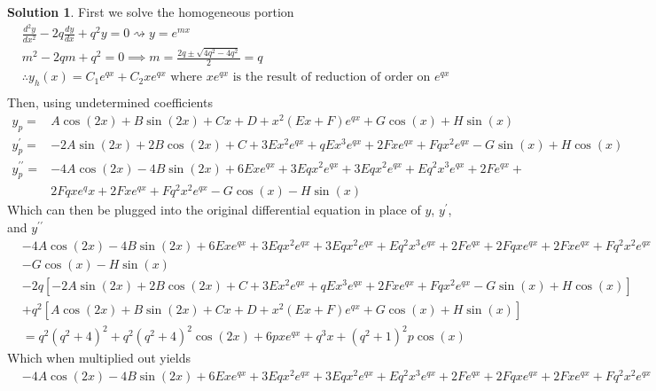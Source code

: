 \documentclass[10pt]{article}
\theoremstyle{definition}
\newtheorem{soln}{Solution}
\begin{document}
\begin{soln} First we solve the homogeneous portion
  \begin{align*}
     & \frac{d^2y}{dx^2}-2q\frac{dy}{dx}+q^2y=0\rightsquigarrow y=e^{mx}                                                    \\
     & m^2-2qm+q^2=0 \implies m = \frac{2q\pm\sqrt{4q^2-4q^2}}{2} = q                                                       \\
     & \therefore y_h(x)=C_1e^{qx}+C_2xe^{qx} \text{ where } xe^{qx} \text{ is the result of reduction of order on } e^{qx} \\
  \end{align*}
  Then, using undetermined coefficients
  \begin{align*}
    y_p=                & A\cos\left(2x\right)+B\sin\left(2x\right)+Cx+D+x^2\left(Ex+F\right)e^{qx}+G\cos(x)+H\sin(x) \\
    y_p^\prime=         & -2A\sin(2x)+2B\cos(2x)+C+3Ex^2e^{qx}+qEx^3e^{qx}+2Fxe^{qx}+Fqx^2e^{qx}-G\sin(x)+H\cos(x)    \\
    y_p^{\prime\prime}= & -4A\cos(2x)-4B\sin(2x)+6Exe^{qx}+3Eqx^2e^{qx}+3Eqx^2e^{qx}+Eq^2x^3e^{qx}+2Fe^{qx}+          \\
                        & 2Fqxe^qx+2Fxe^{qx}+Fq^2x^2e^{qx}-G\cos(x)-H\sin(x)
  \end{align*}
  Which can then be plugged into the original differential equation in place of $y$, $y^\prime$, and $y^{\prime\prime}$
  \begin{align*}
     & -4A\cos(2x)-4B\sin(2x)+6Exe^{qx}+3Eqx^2e^{qx}+3Eqx^2e^{qx}+Eq^2x^3e^{qx}+2Fe^{qx}+2Fqxe^{qx}+2Fxe^{qx}+Fq^2x^2e^{qx} \\ &-G\cos(x)-H\sin(x)    \\
     & -2q\left[-2A\sin(2x)+2B\cos(2x)+C+3Ex^2e^{qx}+qEx^3e^{qx}+2Fxe^{qx}+Fqx^2e^{qx}-G\sin(x)+H\cos(x)\right]             \\
     & +q^2\left[A\cos\left(2x\right)+B\sin\left(2x\right)+Cx+D+x^2\left(Ex+F\right)e^{qx}+G\cos(x)+H\sin(x)\right]         \\
     & =q^2\left(q^2+4\right)^2+q^2\left(q^2+4\right)^2\cos\left(2x\right)+6pxe^{qx}+q^3x+(q^2+1)^2p\cos\left(x\right)
  \end{align*}
  Which when multiplied out yields
  \begin{align*}
     & -4A\cos(2x)-4B\sin(2x)+6Exe^{qx}+3Eqx^2e^{qx}+3Eqx^2e^{qx}+Eq^2x^3e^{qx}+2Fe^{qx}+2Fqxe^{qx}+2Fxe^{qx}+Fq^2x^2e^{qx}               \\

\end{align*}
\end{soln}
\end{document}
